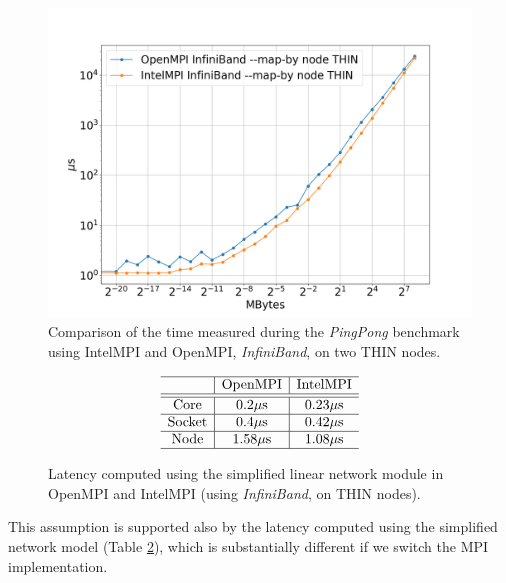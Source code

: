\documentclass{article}
\begin{document}
\begin{figure}[t]
    \centering
    \includegraphics[width=\textwidth]{benchmark/intel_vs_ompi_node.png}
    \caption{Comparison of the time measured during the \emph{PingPong} benchmark using IntelMPI and OpenMPI, \emph{InfiniBand}, on two THIN nodes.}
    \label{fig:ompi_vs_intel}
\end{figure}

\begin{figure}[b]
    $$
        \begin{array}{c | c | c} \hline
            & \text{OpenMPI} & \text{IntelMPI} \\ \hline
            \hline
            \text{Core} & 0.2 \mu \text{s}  & 0.23 \mu \text{s} \\ \hline
            \text{Socket} & 0.4 \mu \text{s}  & 0.42 \mu \text{s} \\ \hline
            \text{Node} & 1.58 \mu \text{s}  & 1.08 \mu \text{s} \\ \hline
        \end{array}
    $$
    \caption{Latency computed using the simplified linear network module in OpenMPI and IntelMPI (using \emph{InfiniBand}, on THIN nodes).}
    \label{tab:lat_ompi_intel}
\end{figure}

This assumption is supported also by the latency computed using the simplified network model (Table \ref{tab:lat_ompi_intel}), which is substantially different if we switch the MPI implementation.
\end{document}

